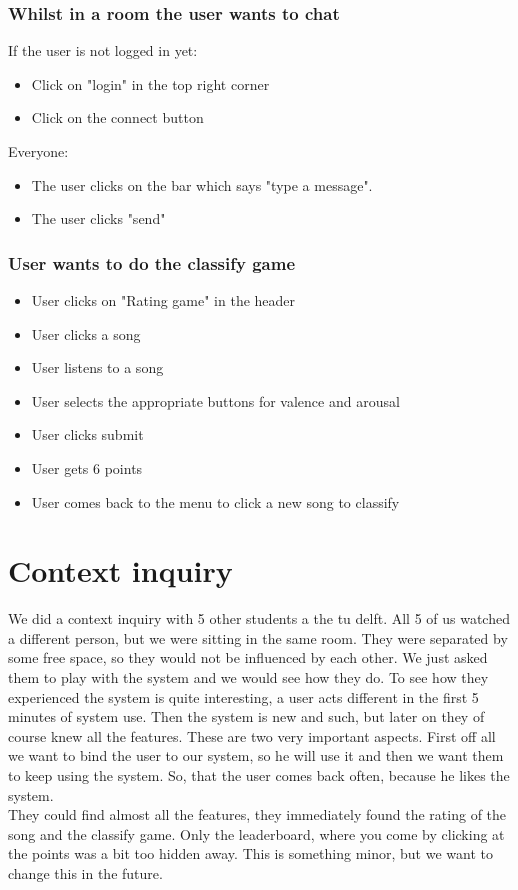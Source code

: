 \subsubsection{Whilst in a room the user wants to chat}
If the user is not logged in yet:
\begin{itemize}
\item Click on "login" in the top right corner
\item Click on the connect button
\end{itemize}
Everyone:
\begin{itemize}
\item The user clicks on the bar which says "type a message".
\item The user clicks "send"
\end{itemize}

\subsubsection{User wants to do the classify game}
\begin{itemize}
\item User clicks on "Rating game" in the header
\item User clicks a song
\item User listens to a song
\item User selects the appropriate buttons for valence and arousal
\item User clicks submit
\item User gets 6 points
\item User comes back to the menu to click a new song to classify
\end{itemize}


\section{Context inquiry}
We did a context inquiry with 5 other students a the tu delft.
All 5 of us watched a different person, but we were sitting in the same room.
They were separated by some free space, so they would not be influenced by each other.
We just asked them to play with the system and we would see how they do.
To see how they experienced the system is quite interesting, a user acts different in the first 5 minutes of system use.
Then the system is new and such, but later on they of course knew all the features.
These are two very important aspects.
First off all we want to bind the user to our system, so he will use it and then we want them to keep using the system.
So, that the user comes back often, because he likes the system.\\
They could find almost all the features, they immediately found the rating of the song and the classify game.
Only the leaderboard, where you come by clicking at the points was a bit too hidden away.
This is something minor, but we want to change this in the future.

